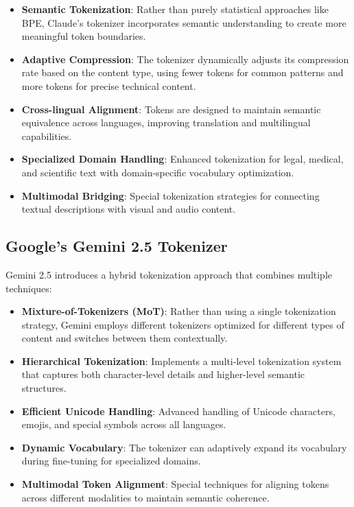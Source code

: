 \documentclass{article}
\begin{document}
\begin{itemize}
\item \textbf{Semantic Tokenization}: Rather than purely statistical approaches like BPE, Claude's tokenizer incorporates semantic understanding to create more meaningful token boundaries.

\item \textbf{Adaptive Compression}: The tokenizer dynamically adjusts its compression rate based on the content type, using fewer tokens for common patterns and more tokens for precise technical content.

\item \textbf{Cross-lingual Alignment}: Tokens are designed to maintain semantic equivalence across languages, improving translation and multilingual capabilities.

\item \textbf{Specialized Domain Handling}: Enhanced tokenization for legal, medical, and scientific text with domain-specific vocabulary optimization.

\item \textbf{Multimodal Bridging}: Special tokenization strategies for connecting textual descriptions with visual and audio content.
\end{itemize}

\subsection{Google's Gemini 2.5 Tokenizer}
Gemini 2.5 introduces a hybrid tokenization approach that combines multiple techniques:

\begin{itemize}
\item \textbf{Mixture-of-Tokenizers (MoT)}: Rather than using a single tokenization strategy, Gemini employs different tokenizers optimized for different types of content and switches between them contextually.

\item \textbf{Hierarchical Tokenization}: Implements a multi-level tokenization system that captures both character-level details and higher-level semantic structures.

\item \textbf{Efficient Unicode Handling}: Advanced handling of Unicode characters, emojis, and special symbols across all languages.

\item \textbf{Dynamic Vocabulary}: The tokenizer can adaptively expand its vocabulary during fine-tuning for specialized domains.

\item \textbf{Multimodal Token Alignment}: Special techniques for aligning tokens across different modalities to maintain semantic coherence.
\end{itemize}
\end{document}

